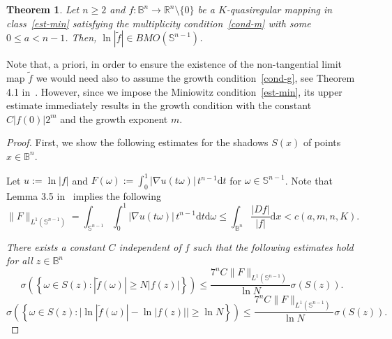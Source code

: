 \documentclass[11pt,a4paper,reqno]{amsart}
\newtheorem{theorem}{Theorem}[section]
\theoremstyle{definition}
\newcommand{\om}{\omega}
\newcommand{\B}{\mathbb{B}^n}
\newcommand{\Rn}{{\mathbb R}^n}
\newcommand{\ud}{\mathrm {d}}
\newcommand{\Sn}{\mathbb{S}^{n-1}}
\numberwithin{komcounter}{section}
\begin{document}
\begin{theorem}\label{thm:log-bmo}
Let $n \geq 2$ and $f: \B\to \Rn \setminus \{0\}$ be a $K$-quasiregular mapping in class~\eqref{est-min} satisfying the  multiplicity condition~\eqref{cond-m} with some $0\leq a<n-1$. Then, $\ln |\tilde{f}|\in BMO(\Sn)$.
\end{theorem}
Note that, a priori, in order to ensure the existence of the non-tangential limit map $\tilde{f}$ we would need also to assume the growth condition~\eqref{cond-g}, see Theorem 4.1 in~\cite{kmv}. However, since we impose the Miniowitz condition~\eqref{est-min}, its upper estimate immediately results in the growth condition with the constant $C|f(0)|2^{m}$ and the growth exponent $m$.
\begin{proof}
 First, we show the following estimates for the shadows $S(x)$ of points $x\in \B$.
 
 Let $u:=\ln |f|$ and $F(\om):=\int_{0}^{1}|\nabla u(t\om)|\,t^{n-1}\ud t$ for $\om\in \Sn$. Note that Lemma 3.5 in~\cite{ag2} implies the following
\begin{equation*}
 \|F\|_{L^1(\Sn)}=\int_{\Sn} \int_{0}^{1}|\nabla u(t\om)|\,t^{n-1}\ud t \ud \om \leq \int_{\B} \frac{|Df|}{|f|} \ud x<c(a, m, n, K). %
\end{equation*}

 \emph{There exists a constant $C$ independent of $f$ such that the following estimates hold for all $z\in \B$
\begin{equation}\label{eq: shadow-est1}
 \sigma\left(\left\{\om \in S(z): |\tilde{f}(\om)|\geq N |f(z)| \right\}\right)\leq \frac{7^n C \|F\|_{L^1(\Sn)}}{\ln N} \sigma(S(z)).
\end{equation}
\begin{equation}\label{eq: shadow-est2}
 \sigma\left(\left\{\om \in S(z): \big|\ln |\tilde{f}(\om)|-\ln|f(z)|\big|\geq \ln N \right\}\right)\leq \frac{7^n C \|F\|_{L^1(\Sn)}}{\ln N} \sigma(S(z)).
\end{equation}
}


\end{proof}
\end{document}
